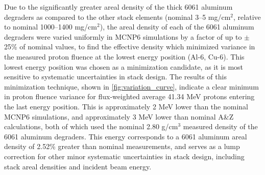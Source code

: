 Due to the  
significantly greater areal density of the thick 6061 aluminum degraders as compared to the other stack elements (nominal 3--5 mg/cm$^2$, relative to nominal 1000--1400 mg/cm$^2$),
the areal density of each of the 6061 aluminum degraders  were varied uniformly in MCNP6 simulations  by a factor of up to $\pm$25\% of nominal values, to find the effective density which minimized variance in the measured proton fluence at the lowest energy position (Al-6, Cu-6).
This lowest energy position was chosen as a minimization candidate, as it is most sensitive to systematic uncertainties in stack design.
The results of this minimization technique, shown in \autoref{fig:variation_curve}, indicate a clear minimum in proton fluence variance for flux-weighted average 41.34 MeV protons entering the last energy position.
This is approximately 2 MeV lower than the nominal MCNP6 simulations, and approximately 3 MeV lower than nominal A\&Z calculations, both of which used the nominal 2.80 g/cm$^3$ measured density of the 6061 aluminum degraders.
This energy corresponds to a 6061 aluminum areal density of 2.52\% greater than nominal measurements, and serves as a lump correction for other minor systematic uncertainties in stack design, including stack areal densities and incident beam energy.




